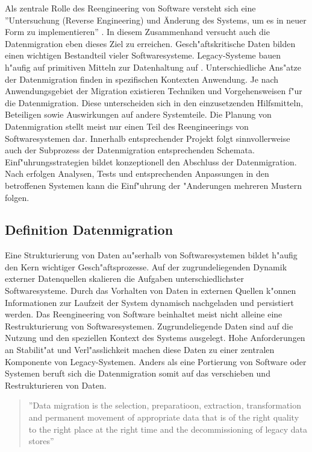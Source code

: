 Als zentrale Rolle des Reengineering von Software versteht sich eine ''Untersuchung (Reverse Engineering) und Änderung des Systems, um es in neuer Form zu implementieren'' \citep{chikofsky-1990}. In diesem Zusammenhand versucht auch die Datenmigration eben dieses Ziel zu erreichen. Gesch"aftskritische Daten bilden einen wichtigen Bestandteil vieler Softwaresysteme. Legacy-Systeme bauen h"aufig auf primitiven Mitteln zur Datenhaltung auf \citep{henrard-2002}.
\lb 
Unterschiedliche Ans"atze der Datenmigration finden in spezifischen Kontexten Anwendung. Je nach Anwendungsgebiet der Migration existieren Techniken und Vorgehensweisen f"ur die Datenmigration. Diese unterscheiden sich in den einzusetzenden Hilfsmitteln, Beteiligen sowie Auswirkungen auf andere Systemteile.
\lb
Die Planung von Datenmigration stellt meist nur einen Teil des Reengineerings von Softwaresystemen dar. Innerhalb entsprechender Projekt folgt sinnvollerweise auch der Subprozess der Datenmigration entsprechenden Schemata.
\lb
Einf"uhrungsstrategien bildet konzeptionell den Abschluss der Datenmigration. Nach erfolgen Analysen, Tests und entsprechenden Anpassungen in den betroffenen Systemen kann die Einf"uhrung der "Anderungen mehreren Mustern folgen.
\lb

\subsection{Definition Datenmigration}

Eine Strukturierung von Daten au"serhalb von Softwaresystemen bildet h"aufig den Kern wichtiger Gesch"aftsprozesse. Auf der zugrundeliegenden Dynamik externer Datenquellen skalieren die Aufgaben unterschiedlichster Softwaresysteme. Durch das Vorhalten von Daten in externen Quellen k"onnen Informationen zur Laufzeit der System dynamisch nachgeladen und persistiert werden.
\lb
Das Reengineering von Software beinhaltet meist nicht alleine eine Restrukturierung von Softwaresystemen. Zugrundeliegende Daten sind auf die Nutzung und den speziellen Kontext des Systems ausgelegt. Hohe Anforderungen an Stabilit"at und Verl"asslichkeit machen diese Daten zu einer zentralen Komponente von Legacy-Systemen.
\lb
Anders als eine Portierung von Software oder Systemen beruft sich die Datenmigration somit auf das verschieben und Restrukturieren von Daten.

\begin{quote}''Data migration is the selection, preparatioon, extraction, transformation and permanent movement of appropriate data that is of the right quality to the right place at the right time and the decommissioning of legacy data stores'' \flushright\citep[S.~7]{morris-2012}
\end{quote}

